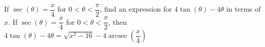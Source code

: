  {If $\sec(\theta) = \dfrac{x}{4}$ for $0 < \theta < \dfrac{\pi}{2}$, find an expression for $4\tan(\theta) - 4\theta$ in terms of $x$.}
{ If $\sec(\theta) = \dfrac{x}{4}$ for $0 < \theta < \dfrac{\pi}{2}$, then $4\tan(\theta) - 4\theta = \sqrt{x^{2} - 16} - 4\operatorname{arcsec} \left( \dfrac{x}{4} \right)$}

